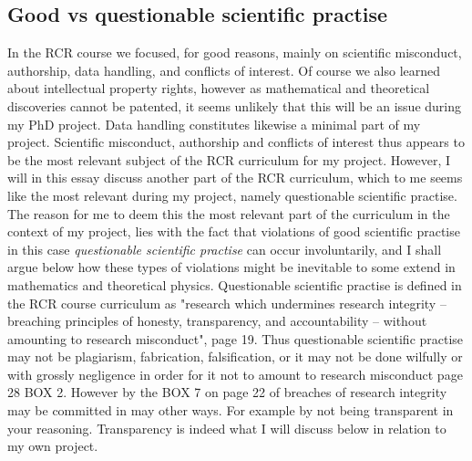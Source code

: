 \documentclass[a4paper, 11pt]{article} %
\begin{document}
\subsection*{Good vs questionable scientific practise}
In the RCR course we focused, for good reasons, mainly on scientific misconduct, authorship, data handling, and conflicts of interest. Of course we also learned about intellectual property rights, however as mathematical and theoretical discoveries cannot be patented, it seems unlikely that this will be an issue during my PhD project. Data handling constitutes likewise a minimal part of my project. Scientific misconduct, authorship and conflicts of interest thus appears to be the most relevant subject of the RCR curriculum for my project. However, I will in this essay discuss another part of the RCR curriculum, which to me seems like the most relevant during my project, namely questionable scientific practise. The reason for me to deem this the most relevant part of the curriculum in the context of my project, lies with the fact that violations of good scientific practise in this case \emph{questionable scientific practise} can occur involuntarily, and I shall argue below how these types of violations might be inevitable to some extend in mathematics and theoretical physics. Questionable scientific practise is defined in the RCR course curriculum as "research which undermines research integrity – breaching principles of honesty, transparency, and
accountability – without amounting to research misconduct", \cite{4d9ee36a3be642848d14f8517fe0f94c} page 19. Thus questionable scientific practise may not be plagiarism, fabrication, falsification, or it may not be done wilfully or with grossly negligence in order for it not to amount to research misconduct \cite{4d9ee36a3be642848d14f8517fe0f94c} page 28 BOX 2. However by the BOX 7 on page 22 of \cite{4d9ee36a3be642848d14f8517fe0f94c} breaches of research integrity may be committed in may other ways. For example by not being transparent in your reasoning. Transparency is indeed what I will discuss below in relation to my own project.
\end{document}
